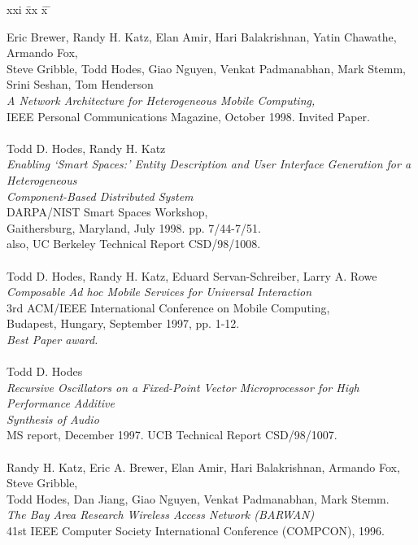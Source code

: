 \begin{tabbing}
xxi \= xx \= x \= \kill

\>    Eric Brewer, Randy H. Katz, Elan Amir, Hari Balakrishnan, Yatin Chawathe, Armando Fox,  \\ 
\>\>\> Steve Gribble, Todd Hodes, Giao Nguyen, Venkat Padmanabhan, Mark Stemm, \\
\>\>\>  Srini Seshan, Tom Henderson \\
\>\>      {\it A Network Architecture for Heterogeneous Mobile Computing,} \\
\>\>       IEEE Personal Communications Magazine, October 1998. Invited Paper. \\
\smallskip \\[-3pt]
\>    Todd D. Hodes, Randy H. Katz \\
\>\>      {\it Enabling `Smart Spaces:' Entity Description and User Interface Generation for a Heterogeneous}  \\
\>\>      {\it  Component-Based Distributed System} \\
\>\>       DARPA/NIST Smart Spaces Workshop,  \\
\>\>       Gaithersburg, Maryland, July 1998.  pp. 7/44-7/51.  \\
\>\>       also, UC Berkeley Technical Report CSD/98/1008. \\


\smallskip \\[-3pt]
\>    Todd D. Hodes, Randy H. Katz, Eduard Servan-Schreiber, Larry A. Rowe \\
\>\>      {\it Composable Ad hoc Mobile Services for Universal Interaction} \\
\>\>       3rd ACM/IEEE International Conference on Mobile Computing,  \\
\>\>        Budapest, Hungary, September 1997, pp. 1-12. \\
\>\>\>       {\em Best Paper award. }\\
\smallskip \\[-3pt]
\>    Todd D. Hodes \\
\>\>      {\it Recursive Oscillators on a Fixed-Point Vector Microprocessor for High Performance Additive } \\
\>\>      {\it   Synthesis of Audio} \\
\>\>       MS report, December 1997. UCB Technical Report CSD/98/1007. \\

\smallskip \\[-3pt]
\>    Randy H. Katz, Eric A. Brewer, Elan Amir, Hari Balakrishnan, Armando Fox, Steve Gribble,  \\
\>\>\> Todd Hodes, Dan Jiang, Giao Nguyen, Venkat Padmanabhan, Mark Stemm. \\
\>\> {\it The Bay Area Research Wireless Access Network (BARWAN)}  \\
\>\> 41st IEEE Computer Society International Conference (COMPCON), 1996. \\




\end{tabbing}
